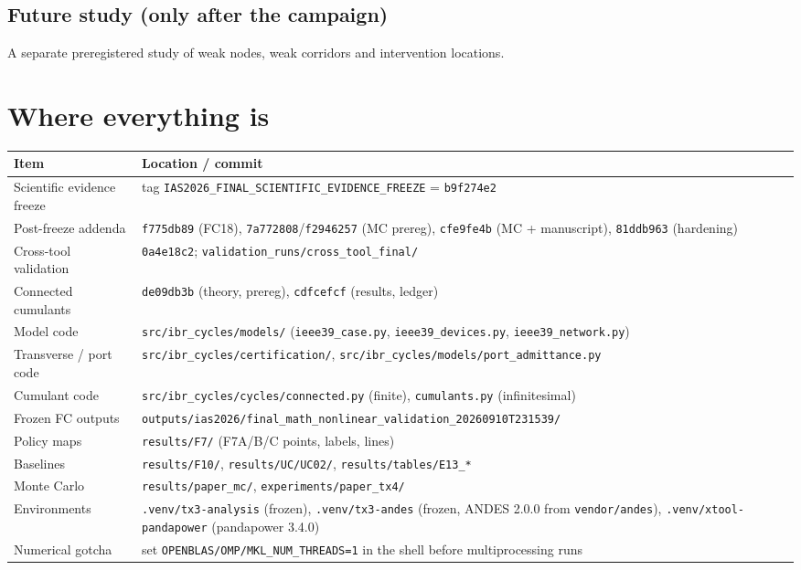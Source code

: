 \documentclass[10pt,a4paper]{article}
\theoremstyle{definition}
\begin{document}
\subsection{Future study (only after the campaign)}
A separate preregistered study of weak nodes, weak corridors and intervention locations.

\section{Where everything is}
\small
\begin{longtable}{@{}L{6.5cm}L{9.5cm}@{}}
\toprule
Item & Location / commit\\
\midrule\endhead
Scientific evidence freeze & tag \texttt{IAS2026\_FINAL\_SCIENTIFIC\_EVIDENCE\_FREEZE} = \texttt{b9f274e2}\\
Post-freeze addenda & \texttt{f775db89} (FC18), \texttt{7a772808}/\texttt{f2946257} (MC prereg), \texttt{cfe9fe4b} (MC + manuscript), \texttt{81ddb963} (hardening)\\
Cross-tool validation & \texttt{0a4e18c2}; \nolinkurl{validation_runs/cross_tool_final/}\\
Connected cumulants & \texttt{de09db3b} (theory, prereg), \texttt{cdfcefcf} (results, ledger)\\
Model code & \nolinkurl{src/ibr_cycles/models/} (\texttt{ieee39\_case.py}, \texttt{ieee39\_devices.py}, \texttt{ieee39\_network.py})\\
Transverse / port code & \nolinkurl{src/ibr_cycles/certification/}, \nolinkurl{src/ibr_cycles/models/port_admittance.py}\\
Cumulant code & \nolinkurl{src/ibr_cycles/cycles/connected.py} (finite), \texttt{cumulants.py} (infinitesimal)\\
Frozen FC outputs & \nolinkurl{outputs/ias2026/final_math_nonlinear_validation_20260910T231539/}\\
Policy maps & \nolinkurl{results/F7/} (F7A/B/C points, labels, lines)\\
Baselines & \nolinkurl{results/F10/}, \nolinkurl{results/UC/UC02/}, \nolinkurl{results/tables/E13_*}\\
Monte Carlo & \nolinkurl{results/paper_mc/}, \nolinkurl{experiments/paper_tx4/}\\
Environments & \nolinkurl{.venv/tx3-analysis} (frozen), \nolinkurl{.venv/tx3-andes} (frozen, ANDES 2.0.0 from \nolinkurl{vendor/andes}), \nolinkurl{.venv/xtool-pandapower} (pandapower 3.4.0)\\
Numerical gotcha & set \nolinkurl{OPENBLAS/OMP/MKL_NUM_THREADS=1} in the shell before multiprocessing runs\\
\bottomrule
\end{longtable}
\normalsize
\end{document}
